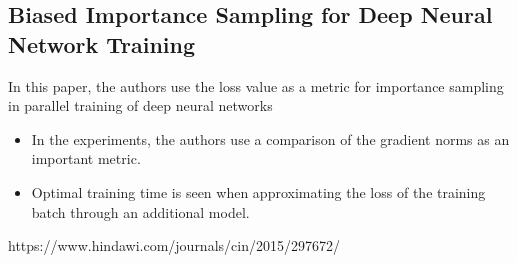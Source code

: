 \documentclass{article}
\begin{document}
\subsection{Biased Importance Sampling for Deep Neural Network Training}

In this paper, the authors use the loss value as a metric for importance sampling in parallel training of deep neural networks

\begin{itemize}

    \item In the experiments, the authors use a comparison of the gradient norms as an important metric. 
    \item Optimal training time is seen when approximating the loss of the training batch through an additional model.

\end{itemize}

https://www.hindawi.com/journals/cin/2015/297672/
\end{document}
